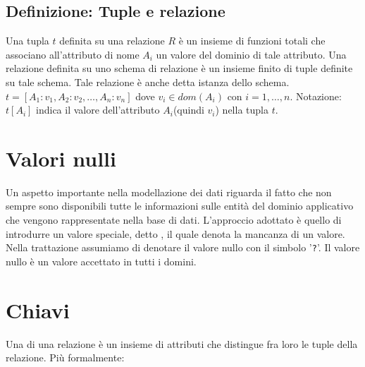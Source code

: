 \documentclass[12pt, a4paper]{report}
\begin{document}
            \subsection{Definizione: Tuple e relazione}
                Una tupla $t$ definita su una relazione $R$ è un insieme di funzioni totali che associano all'attributo di nome $A_{i}$ un valore del dominio di tale attributo. Una relazione definita su uno schema di relazione è un insieme finito di tuple definite su tale schema. Tale relazione è anche detta istanza dello schema. $t=\left[A_{1}:v_{1},A_{2}:v_{2},\ldots,A_{n}:v_{n}\right]$ dove $v_{i}\in dom(A_{i}) \text{ con } i=1,\ldots,n$. Notazione: $t[A_{i}]$ indica il valore dell'attributo $A_{i}$(quindi $v_{i}$) nella tupla $t$.
        \section{Valori nulli}
            Un aspetto importante nella modellazione dei dati riguarda il fatto che non sempre sono disponibili tutte le informazioni sulle entità del dominio applicativo che vengono rappresentate nella base di dati. L'approccio adottato è quello di introdurre un valore speciale, detto , il quale denota la mancanza di un valore.\\
            Nella trattazione assumiamo di denotare il valore nullo con il simbolo '\texttt{?}'. Il valore nullo è un valore accettato in tutti i domini.
        \section{Chiavi}
            Una  di una relazione è un insieme di attributi che distingue fra loro le tuple della relazione. Più formalmente:
\end{document}
